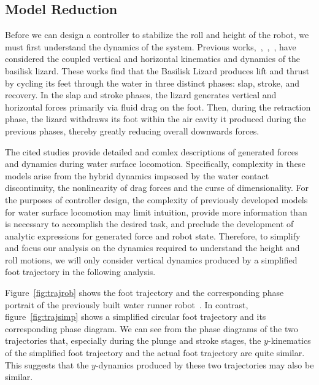 \subsection{Model Reduction}

Before we can design a controller to stabilize the roll and height of the robot, we must first understand the dynamics of the system. Previous works,~\cite{glasheen1996hydrodynamic},~\cite{floyd2008design},~\cite{hsieh2004running}, have considered the coupled vertical and horizontal kinematics and dynamics of the basilisk lizard. These works find that the Basilisk Lizard produces lift and thrust by cycling its feet through the water in three distinct phases: slap, stroke, and recovery. In the slap and stroke phases, the lizard generates vertical and horizontal forces primarily via fluid drag on the foot. Then, during the retraction phase, the lizard withdraws its foot within the air cavity it produced during the previous phases, thereby greatly reducing overall downwards forces. 

The cited studies provide detailed and comlex descriptions of generated forces and dynamics during water surface locomotion. Specifically, complexity in these models arise from the hybrid dynamics impsosed by the water contact discontinuity, the nonlinearity of drag forces and the curse of dimensionality. For the purposes of controller design, the complexity of previously developed models for water surface locomotion may limit intuition, provide more information than is necessary to accomplish the desired task, and preclude the development of analytic expressions for generated force and robot state. Therefore, to simplify and focus our analysis on the dynamics required to understand the height and roll motions, we will only consider vertical dynamics produced by a simplified foot trajectory in the following analysis. 

Figure~\ref{fig:trajrob} shows the foot trajectory  and the corresponding phase portrait of the previously built water runner robot~\cite{park2010roll}. In contrast, figure~\ref{fig:trajsimp} shows a simplified circular foot trajectory and its corresponding phase diagram. We can see from the phase diagrams of the two trajectories that, especially during the plunge and stroke stages, the $y$-kinematics of the simplified foot trajectory and the actual foot trajectory are quite similar. This suggests that the $y$-dynamics produced by these two trajectories may also be similar.


